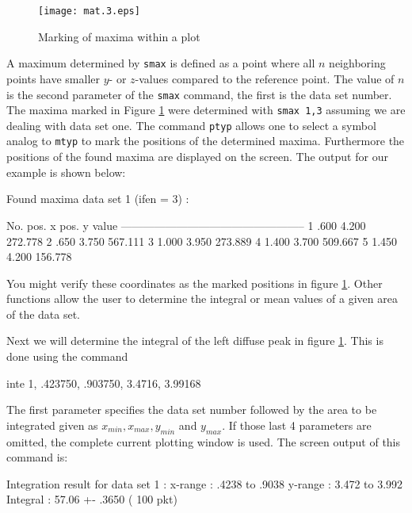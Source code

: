 \begin{figure}[!t]
   \centering
   \texttt{[image: mat.3.eps]}
   \caption{Marking of maxima within a plot}
   \label{mat-fig3}
\end{figure}

A maximum determined by {\tt smax} is defined as a point where all
$n$ neighboring points have smaller $y$- or $z$-values compared to
the reference point. The value of $n$ is the second parameter of the
{\tt smax} command, the first is the data set number. The maxima
marked in Figure \ref{mat-fig3} were determined with {\tt smax 1,3}
assuming we are dealing with data set one. The command {\tt ptyp}
allows one to select a symbol analog to {\tt mtyp} to mark the
positions of the determined maxima. Furthermore the positions of the
found maxima are displayed on the screen. The output for our example
is shown below:

\begin{MacVerbatim}
   Found maxima data set   1 (ifen =   3) :

      No.        pos. x       pos. y         value
      --------------------------------------------------
        1         .600        4.200             272.778
        2         .650        3.750             567.111
        3        1.000        3.950             273.889
        4        1.400        3.700             509.667
        5        1.450        4.200             156.778
\end{MacVerbatim}

You might verify these coordinates as the marked positions in figure
\ref{mat-fig3}. Other functions allow the user to determine the
integral or mean values of a given area of the data set.\par

Next we will determine the integral of the left diffuse peak in
figure \ref{mat-fig3}. This is done using the command

\begin{MacVerbatim}
    inte 1, .423750, .903750, 3.4716, 3.99168
\end{MacVerbatim}

The first parameter specifies the data set number followed by the area
to be integrated given as $x_{min}, x_{max}, y_{min}$ and $y_{max}$.
If those last 4 parameters are omitted, the complete current plotting
window is used. The screen output of this command is:

\footnotesize
\begin{MacVerbatim}
    Integration result for data set   1 :
       x-range    :    .4238     to    .9038
       y-range    :    3.472     to    3.992
       Integral   :    57.06     +-    .3650      (    100 pkt)
\end{MacVerbatim}
\normalsize

